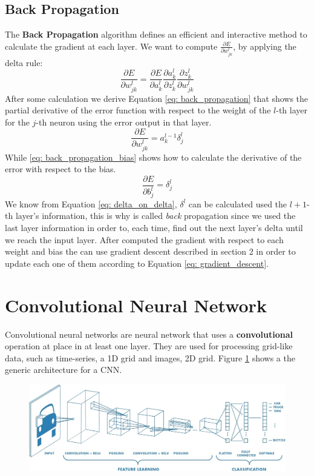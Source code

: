 \documentclass[11pt]{article}
\begin{document}
\subsection{Back Propagation}
The \textbf{Back Propagation} algorithm defines an efficient and interactive method to calculate the gradient at each layer. We want to compute $\frac{\partial E}{\partial w^l_{jk}}$, by applying the delta rule: 
\begin{equation}
\frac{\partial E}{\partial w^l_{jk}} = 	\frac{\partial E}{\partial a^l_k}\frac{\partial a^l_k}{\partial z^l_k}\frac{\partial z^l_k}{\partial w^l_{jk}}
\end{equation}
After some calculation we derive Equation \ref{eq: back_propagation} that shows the partial derivative of the error function with respect to the weight of the $l$-th layer for the $j$-th neuron using the error output in that layer.
\begin{equation}
\frac{\partial E}{\partial w^l_{jk}} = a^{l-1}_k \delta^l_j
\label{eq: back_propagation}
\end{equation}  
While \ref{eq: back_propagation_bias} shows how to calculate the derivative of the error with respect to the bias.
\begin{equation}
\frac{\partial E}{\partial b^l_j} = \delta^l_j
\label{eq: back_propagation_bias}
\end{equation}
We know from Equation \ref{eq: delta_on_delta}, $\delta^l$ can be calculated used the $l+1$-th layer's information, this is why is called \emph{back} propagation since we used the last layer information in order to, each time, find out the next layer's delta until we reach the input layer.
After computed the gradient with respect to each weight and bias the can use gradient descent described in section 2 in order to update each one of them according to Equation \ref{eq: gradient_descent}.
\section{Convolutional Neural Network}
Convolutional neural networks are neural network that uses a \textbf{convolutional} operation at place in at least one layer. They are used for processing grid-like data, such as time-series, a 1D grid and images, 2D grid. Figure \ref{fig: cnn} shows a the generic architecture for a CNN.
\begin{figure}[H]
\centering
\includegraphics[scale=0.35]{images/cnn}
\caption{}
\label{fig: cnn}	
\end{figure}
\end{document}
